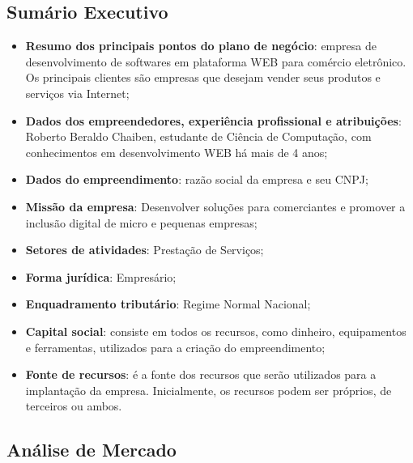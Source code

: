 \documentclass[12pt]{article}
\begin{document}
\subsection{Sumário Executivo}

\begin{itemize}

	\item \textbf{Resumo dos principais pontos do plano de negócio}: empresa de desenvolvimento de softwares
	em plataforma WEB para comércio eletrônico. Os principais clientes são empresas que desejam vender seus
	produtos e serviços via Internet;
	
	\item \textbf{Dados dos empreendedores, experiência profissional e atribuições}: Roberto Beraldo Chaiben,
	estudante de Ciência de Computação, com conhecimentos em desenvolvimento WEB há mais de 4 anos;
	
	\item \textbf{Dados do empreendimento}: razão social da empresa e seu CNPJ;
	
	\item \textbf{Missão da empresa}: Desenvolver soluções para comerciantes e promover a inclusão digital de
	micro e pequenas empresas;
	
	\item \textbf{Setores de atividades}: Prestação de Serviços;
	
	\item \textbf{Forma jurídica}: Empresário;

	\item \textbf{Enquadramento tributário}: Regime Normal Nacional;

	\item \textbf{Capital social}: consiste em todos os recursos, como dinheiro, equipamentos e ferramentas, utilizados para a
	criação do empreendimento;
	
	\item \textbf{Fonte de recursos}: é a fonte dos recursos que serão utilizados para a implantação da empresa. Inicialmente,
	os recursos podem ser próprios, de terceiros ou ambos. 

\end{itemize}


\subsection{Análise de Mercado}
\end{document}
